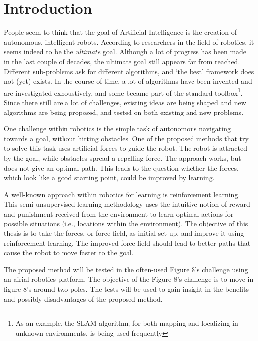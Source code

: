 \documentclass[11pt]{article}
\begin{document}
\pagestyle{empty} %
\tableofcontents
\pagebreak



\setcounter{page}{2}
\section{Introduction}
\label{sec:intro}


People seem to think that the goal of Artificial Intelligence is the creation of autonomous, intelligent robots. According to researchers in the field of robotics, it seems indeed to be the \emph{ultimate} goal. Although a lot of progress has been made in the last couple of decades, the ultimate goal still appears far from reached. Different sub-problems ask for different algorithms, and `the best' framework does not (yet) exists. In the course of time, a lot of algorithms have been invented and are investigated exhoustively, and some became part of the standard toolbox\footnote{As an example, the SLAM algorithm, for both mapping and localizing in unknown environments, is being used frequently}. Since there still are a lot of challenges, existing ideas are being shaped and new algorithms are being proposed, and tested on both existing and new problems.

One challenge within robotics is the simple task of autonomous navigating towards a goal, without hitting obstacles. One of the proposed methods that try to solve this task uses artificial forces to guide the robot. The robot is attracted by the goal, while obstacles spread a repelling force. The approach works, but does not give an optimal path. This leads to the question whether the forces, which look like a good starting point, could be improved by learning.

A well-known approach within robotics for learning is reinforcement learning. This semi-unsupervised learning methodology uses the intuitive notion of reward and punishment received from the environment to learn optimal actions for possible situations (i.e., locations within the environment). The objective of this thesis is to take the forces, or force field, as initial set up, and improve it using reinforcement learning. The improved force field should lead to better paths that cause the robot to move faster to the goal.

The proposed method will be tested in the often-used Figure 8's challenge using an airial robotics platform. The objective of the Figure 8's challenge is to move in figure 8's around two poles. The tests will be used to gain insight in the benefits and possibly disadvantages of the proposed method.
\end{document}
